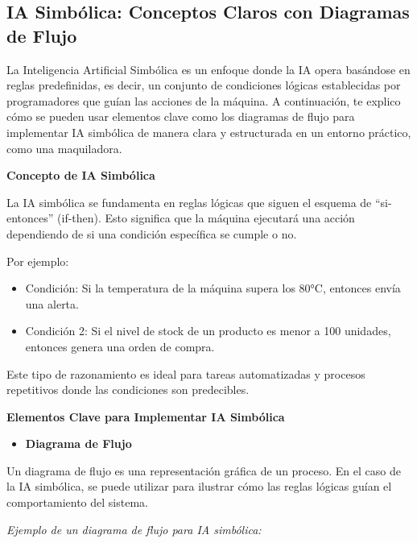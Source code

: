 \documentclass[
  10pt,
  letterpaper,
]{book}
\providecommand{\tightlist}{%
  \setlength{\itemsep}{0pt}\setlength{\parskip}{0pt}}\usepackage{longtable,booktabs,array}
\begin{document}
\subsection{IA Simbólica: Conceptos Claros con Diagramas de
Flujo}\label{ia-simbuxf3lica-conceptos-claros-con-diagramas-de-flujo}

La Inteligencia Artificial Simbólica es un enfoque donde la IA opera
basándose en reglas predefinidas, es decir, un conjunto de condiciones
lógicas establecidas por programadores que guían las acciones de la
máquina. A continuación, te explico cómo se pueden usar elementos clave
como los diagramas de flujo para implementar IA simbólica de manera
clara y estructurada en un entorno práctico, como una maquiladora.

\textbf{Concepto de IA Simbólica}

La IA simbólica se fundamenta en reglas lógicas que siguen el esquema de
``si-entonces'' (if-then). Esto significa que la máquina ejecutará una
acción dependiendo de si una condición específica se cumple o no.

Por ejemplo:

\begin{itemize}
\tightlist
\item
  Condición: Si la temperatura de la máquina supera los 80°C, entonces
  envía una alerta.
\item
  Condición 2: Si el nivel de stock de un producto es menor a 100
  unidades, entonces genera una orden de compra.
\end{itemize}

Este tipo de razonamiento es ideal para tareas automatizadas y procesos
repetitivos donde las condiciones son predecibles.

\textbf{Elementos Clave para Implementar IA Simbólica}

\begin{itemize}
\tightlist
\item
  \textbf{Diagrama de Flujo}
\end{itemize}

Un diagrama de flujo es una representación gráfica de un proceso. En el
caso de la IA simbólica, se puede utilizar para ilustrar cómo las reglas
lógicas guían el comportamiento del sistema.

\emph{Ejemplo de un diagrama de flujo para IA simbólica:}
\end{document}

